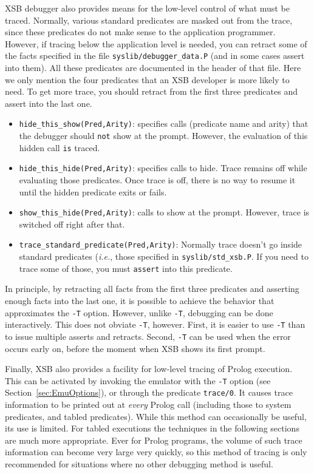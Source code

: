 XSB debugger also provides means for the low-level control of what
must be traced. Normally, various standard predicates are masked out
from the trace, since these predicates do not make sense to the
application programmer.  However, if tracing below the application
level is needed, you can retract some of the facts specified in the
file {\tt syslib/debugger\_data.P} (and in some cases assert into
them). All these predicates are documented in the header of that
file. Here we only mention the four predicates that an XSB developer
is more likely to need. To get more trace, you should retract from the
first three predicates and assert into the last one.
\begin{itemize}
\item {\tt hide\_this\_show(Pred,Arity)}: specifies calls (predicate name and
  arity) that the debugger should {\tt not} show at the prompt. However,
  the evaluation of this hidden call {\tt is} traced.
\item {\tt hide\_this\_hide(Pred,Arity)}: specifies calls to hide. Trace
  remains off while evaluating those predicates. Once trace is off, there
  is no way to resume it until the hidden predicate exits or fails.
\item  {\tt show\_this\_hide(Pred,Arity)}: calls to show at the
  prompt. However, trace is switched off right after that.
\item  {\tt trace\_standard\_predicate(Pred,Arity)}: Normally trace doesn't
  go inside standard predicates ({\it i.e.}, those specified in
  {\tt syslib/std\_xsb.P}. If you need to trace some of those, you must
  {\tt assert} into this predicate.
\end{itemize}
In principle, by retracting all facts from the first three predicates and
asserting enough facts into the last one, it is possible to achieve the
behavior that approximates the {\tt -T} option. However, unlike {\tt -T},
debugging can be done interactively. This does not obviate {\tt -T},
however. First, it is easier to use {\tt -T} than to issue multiple asserts
and retracts. Second, {\tt -T} can be used when the error occurs early on,
before the moment when XSB shows its first prompt.

Finally, XSB also provides a facility for low-level tracing of Prolog
execution.  This can be activated by invoking the emulator with the
{\tt -T} option (see Section~\ref{sec:EmuOptions}), or through the
predicate {\tt trace/0}.   It causes trace
information to be printed out at {\em every} Prolog call (including
those to system predicates, and tabled predicates).  While this method
can occasionally be useful, its use is limited.  For tabled executions
the techniques in the following sections are much more appropriate.
Ever for Prolog programs, the volume of such trace information can become
very large very quickly, so this method of tracing is only recommended
for situations where no other debugging method is useful.

